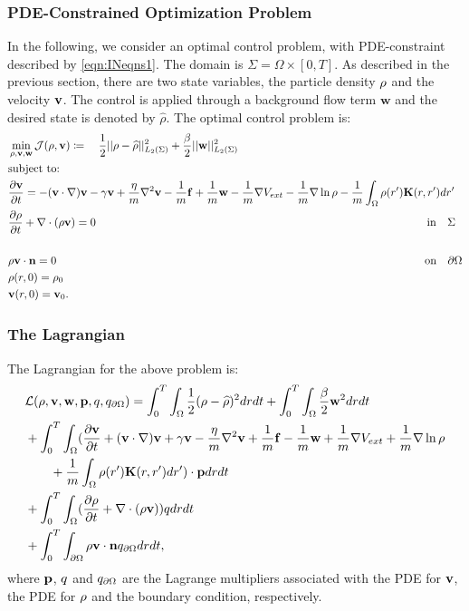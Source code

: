 
\subsubsection{PDE-Constrained Optimization Problem}
In the following, we consider an optimal control problem, with PDE-constraint described by \eqref{eqn:INeqns1}. 
The domain is $\Sigma=\Omega \times [0,T]$. As described in the previous section, there are two state variables, the particle density $\rho$ and the velocity $\mathbf{v}$. The control is applied through a background flow term $\mathbf{w}$ and the desired state is denoted by $\widehat \rho$. The optimal control problem is:
\begin{align*}
&\min_{\rho,\mathbf{v},\mathbf{w} } \mathcal J(\rho,\mathbf{v}) \coloneqq \quad \frac{1}{2}||\rho - \widehat {\rho}||_{L_2(\Sigma)}^2  +\frac{\beta}{2}||\mathbf{w}||_{L_2(\Sigma)}^2\\
&\text{subject to:}\\
& \frac{\partial \mathbf{v}}{\partial t}= -  (\mathbf{v} \cdot \nabla)\mathbf{v} - \gamma  \mathbf{v} + \frac{\eta}{m} \nabla^2 \mathbf{v}  -\frac{1}{m}\mathbf{f} +\frac{1}{m}\mathbf{w} -\frac{1}{m} \nabla V_{ext} - \frac{1}{m}\nabla \ln \rho  -\frac{1}{m}\int_\Omega \rho(r') \mathbf{K}(r,r')dr' \\
&\frac{\partial \rho}{\partial t} + \nabla \cdot (\rho \mathbf{v})=0 \qquad\qquad \qquad\qquad\qquad\quad \quad\quad\qquad \qquad\qquad \qquad\qquad\qquad\quad \qquad\quad\ \ \text{in} \quad \Sigma\\
\\
&\rho \mathbf{v} \cdot \mathbf{n} =0\qquad\qquad \qquad\qquad\qquad\qquad\qquad\qquad\qquad \qquad\qquad \qquad\qquad\qquad \qquad\qquad\quad  \text{on} \quad \partial  \Omega\\
& \rho(r,0)=\rho_0\\
& \mathbf{v}(r,0)=\mathbf{v}_0.
\end{align*}

\subsubsection*{The Lagrangian}
The Lagrangian for the above problem is:
\begin{align*}
&\mathcal{L}(\rho,\mathbf{v},\mathbf{w},\mathbf{p},q,{q}_{\partial \Omega}) = \int_0^T \int_\Omega  \frac{1}{2}(\rho - \widehat {\rho})^2 drdt  +\int_0^T \int_\Omega  \frac{\beta}{2}\mathbf{w}^2 drdt\\
&+ \int_0^T \int_\Omega (\frac{\partial \mathbf{v}}{\partial t}+  (\mathbf{v} \cdot \nabla)\mathbf{v} + \gamma  \mathbf{v} - \frac{\eta}{m} \nabla^2 \mathbf{v}  +\frac{1}{m}\mathbf{f} -\frac{1}{m}\mathbf{w} +\frac{1}{m} \nabla V_{ext} + \frac{1}{m}\nabla \ln \rho  \\
&\quad \quad +\frac{1}{m}\int_\Omega \rho(r') \mathbf{K}(r,r')dr') \cdot \mathbf{p} dr dt\\
& + \int_0^T \int_\Omega (\frac{\partial \rho}{\partial t} + \nabla \cdot (\rho \mathbf{v})) q dr dt\\ 
& +\int_0^T \int_{\partial\Omega} \rho \mathbf{v} \cdot \mathbf{n} {q}_{\partial \Omega} dr dt,
\end{align*}
where $\mathbf{p}$, $q$ and ${q}_{\partial \Omega}$ are the Lagrange multipliers associated with the PDE for $\mathbf{v}$, the PDE for $\rho$ and the boundary condition, respectively.


